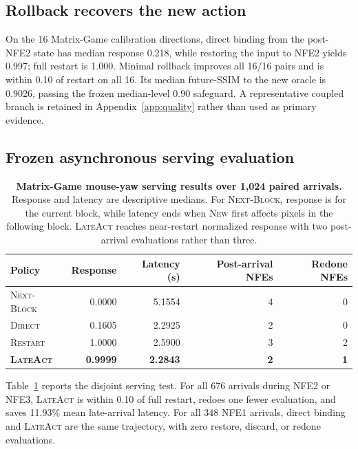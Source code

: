 \documentclass{article}
\newcommand{\method}{\textsc{LateAct}}
\newcommand{\new}{\textsc{New}}
\newcommand{\direct}{\textsc{Direct}}
\newcommand{\restart}{\textsc{Restart}}
\newcommand{\nfe}{\textsc{NFE}}
\begin{document}
\subsection{Rollback recovers the new action}

On the 16 Matrix-Game calibration directions, direct binding from the
post-\nfe{}2 state has median response 0.218, while restoring the input to
\nfe{}2 yields 0.997; full restart is 1.000. Minimal rollback improves all
16/16 pairs and is within 0.10 of restart on all 16. Its median future-SSIM to
the new oracle is 0.9026, passing the frozen median-level 0.90 safeguard. A
representative coupled branch is retained in Appendix~\ref{app:quality} rather
than used as primary evidence.

\subsection{Frozen asynchronous serving evaluation}

\begin{table}[t]
  \centering
  \caption{\textbf{Matrix-Game mouse-yaw serving results over 1,024 paired
  arrivals.} Response and latency are descriptive medians. For
  \textsc{Next-Block}, response is for the current block, while latency ends
  when \new{} first affects pixels in the following block. \method{} reaches
  near-restart normalized response with two post-arrival evaluations rather
  than three.}
  \label{tab:serving}
  \small
  \begin{tabular}{lrrrr}
    \toprule
    Policy & Response & Latency (s) & Post-arrival NFEs & Redone NFEs \\
    \midrule
    \textsc{Next-Block} & 0.0000 & 5.1554 & 4 & 0 \\
    \direct{}            & 0.1605 & 2.2925 & 2 & 0 \\
    \restart{}           & 1.0000 & 2.5900 & 3 & 2 \\
    \textbf{\method{}}   & \textbf{0.9999} & \textbf{2.2843} & \textbf{2} & \textbf{1} \\
    \bottomrule
  \end{tabular}
\end{table}

Table~\ref{tab:serving} reports the disjoint serving test. For all 676 arrivals
during \nfe{}2 or \nfe{}3, \method{} is within 0.10 of full restart, redoes
one fewer evaluation, and saves 11.93\% mean late-arrival latency. For all 348
\nfe{}1 arrivals, direct binding and \method{} are the same trajectory, with
zero restore, discard, or redone evaluations.
\end{document}
